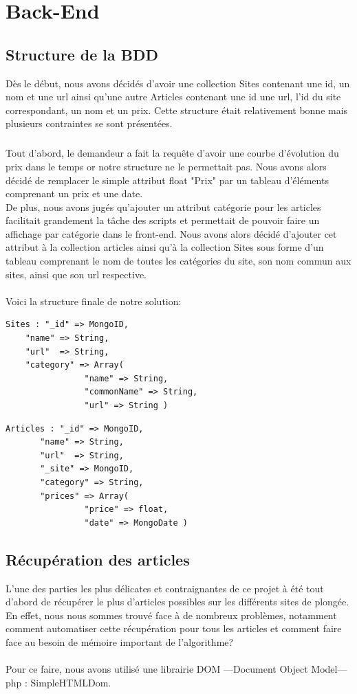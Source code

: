 \documentclass{report}
\begin{document}
\chapter{Back-End}
\section{Structure de la BDD}
Dès le début, nous avons décidés d'avoir une collection Sites contenant une id, un nom et une url ainsi qu'une autre Articles contenant une id une url, l'id du site correspondant, un nom et un prix.
Cette structure était relativement bonne mais plusieurs contraintes se sont présentées.\\
\paragraph{}
Tout d'abord, le demandeur a fait la requête d'avoir une courbe d'évolution du prix dans le temps or notre structure ne le permettait pas. Nous avons alors décidé de remplacer le simple attribut float "Prix" par un tableau d'éléments comprenant un prix et une date.\\
De plus, nous avons jugés qu'ajouter un attribut catégorie pour les articles facilitait grandement la tâche des scripts et permettait de pouvoir faire un affichage par catégorie dans le front-end. Nous avons alors décidé d'ajouter cet attribut à la collection articles ainsi qu'à la collection Sites sous forme d'un tableau comprenant le nom de toutes les catégories du site, son nom commun aux sites, ainsi que son url respective.\\\\
Voici la structure finale de notre solution:
\begin{lstlisting}
Sites :	"_id" => MongoID,
	"name" => String,
	"url"  => String,
	"category" => Array(
				"name" => String,
				"commonName" => String,
				"url" => String )
\end{lstlisting}
\newpage
\begin{lstlisting}							
Articles : "_id" => MongoID,
	   "name" => String,
	   "url"  => String,
	   "_site" => MongoID,
	   "category" => String,
	   "prices"	=> Array(
				"price" => float,
				"date" => MongoDate )
\end{lstlisting}

\section{Récupération des articles}
L'une des parties les plus délicates et contraignantes de ce projet à été tout d'abord de récupérer le plus d'articles possibles sur les différents sites de plongée.\\
En effet, nous nous sommes trouvé face à de nombreux problèmes, notamment comment automatiser cette récupération pour tous les articles et comment faire face au besoin de mémoire important de l'algorithme?\\\\
Pour ce faire, nous avons utilisé une librairie DOM —Document Object Model— php : SimpleHTMLDom.\\
\end{document}
